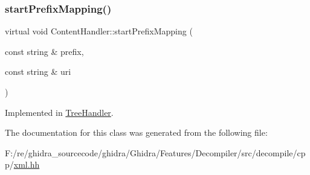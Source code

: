 \subsubsection{\texorpdfstring{startPrefixMapping()}{startPrefixMapping()}}
{\footnotesize\ttfamily virtual void Content\+Handler\+::start\+Prefix\+Mapping (\begin{DoxyParamCaption}\item[{const string \&}]{prefix,  }\item[{const string \&}]{uri }\end{DoxyParamCaption})\hspace{0.3cm}{\ttfamily [pure virtual]}}



Implemented in \mbox{\hyperlink{class_tree_handler_a086404533a2eca59f3efddbcc0e35c06}{Tree\+Handler}}.



The documentation for this class was generated from the following file\+:\begin{DoxyCompactItemize}
\item 
F\+:/re/ghidra\+\_\+sourcecode/ghidra/\+Ghidra/\+Features/\+Decompiler/src/decompile/cpp/\mbox{\hyperlink{xml_8hh}{xml.\+hh}}\end{DoxyCompactItemize}
